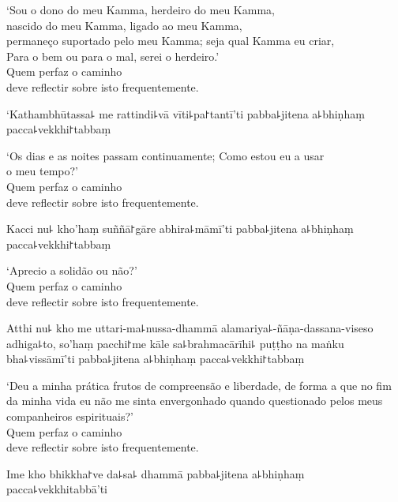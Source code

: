 \documentclass[
  babelLanguage=english,
  final,
  webversion,
]{chantingbook}
\begin{document}
\enlargethispage{2\baselineskip}

\begin{english}
  `Sou o dono do meu Kamma, herdeiro do meu Kamma,\\
  nascido do meu Kamma, ligado ao meu Kamma,\\
  permaneço suportado pelo meu Kamma; seja qual Kamma eu criar,\\
  Para o bem ou para o mal,  serei o herdeiro.'\\
  Quem perfaz o caminho\\
  deve reflectir sobre isto frequentemente.
\end{english}

\clearpage

`Kathambhūtassa꜕ me rattindi꜕vā vīti꜕pa꜓tantī'ti pabba꜕jitena a꜕bhiṇhaṃ pacca꜕vekkhi꜓tabbaṃ

\begin{english}
  `Os dias e as noites passam continuamente; Como estou eu a usar\\ o meu tempo?'\\
 Quem perfaz o caminho\\
 deve reflectir sobre isto frequentemente.
\end{english}

Kacci nu꜕ kho'haṃ suññā꜓gāre abhira꜕māmī'ti pabba꜕jitena a꜕bhiṇhaṃ pacca꜕vekkhi꜓tabbaṃ

\begin{english}
  `Aprecio a solidão ou não?'\\
  Quem perfaz o caminho\\
  deve reflectir sobre isto frequentemente.
\end{english}

Atthi nu꜕ kho me uttari-ma꜕nussa-dhammā alamariya꜕-ñāṇa-dassana-viseso adhiga꜕to, so'haṃ pacchi꜓me kāle sa꜕brahmacārīhi꜕ puṭṭho na maṅku bha꜕vissāmī'ti pabba꜕jitena a꜕bhiṇhaṃ pacca꜕vekkhi꜓tabbaṃ

\begin{english}
  `Deu a minha prática frutos de compreensão e liberdade, de forma a que no fim da minha vida eu não me sinta envergonhado quando questionado pelos meus companheiros espirituais?'\\
  Quem perfaz o caminho\\
  deve reflectir sobre isto frequentemente.
\end{english}

Ime kho bhikkha꜓ve da꜕sa꜕ dhammā pabba꜕jitena a꜕bhiṇhaṃ pacca꜕vekkhitabbā'ti
\end{document}
